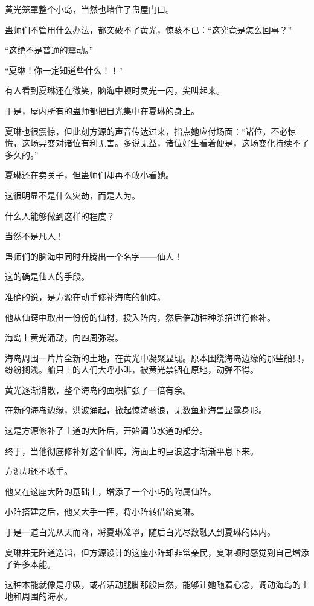 \begin{this_body}
黄光笼罩整个小岛，当然也堵住了蛊屋门口。

蛊师们不管用什么办法，都突破不了黄光，惊骇不已：“这究竟是怎么回事？”

“这绝不是普通的震动。”

“夏琳！你一定知道些什么！！”

有人看到夏琳还在微笑，脑海中顿时灵光一闪，尖叫起来。

于是，屋内所有的蛊师都把目光集中在夏琳的身上。

夏琳也很震惊，但此刻方源的声音传达过来，指点她应付场面：“诸位，不必惊慌，这场异变对诸位有利无害。多说无益，诸位好生看着便是，这场变化持续不了多久的。”

夏琳还在卖关子，但蛊师们却再不敢小看她。

这很明显不是什么灾劫，而是人为。

什么人能够做到这样的程度？

当然不是凡人！

蛊师们的脑海中同时升腾出一个名字——仙人！

这的确是仙人的手段。

准确的说，是方源在动手修补海底的仙阵。

他从仙窍中取出一份份的仙材，投入阵内，然后催动种种杀招进行修补。

海岛上黄光涌动，向四周弥漫。

海岛周围一片片全新的土地，在黄光中凝聚显现。原本围绕海岛边缘的那些船只，纷纷搁浅。船只上的人们大呼小叫，被黄光禁锢在原地，动弹不得。

黄光逐渐消散，整个海岛的面积扩张了一倍有余。

在新的海岛边缘，洪波涌起，掀起惊涛骇浪，无数鱼虾海兽显露身形。

这是方源修补了土道的大阵后，开始调节水道的部分。

终于，当他彻底修补好这个仙阵，海面上的巨浪这才渐渐平息下来。

方源却还不收手。

他又在这座大阵的基础上，增添了一个小巧的附属仙阵。

小阵搭建之后，他又大手一挥，将小阵转借给夏琳。

于是一道白光从天而降，将夏琳笼罩，随后白光尽数融入到夏琳的体内。

夏琳并无阵道造诣，但方源设计的这座小阵却非常亲民，夏琳顿时感觉到自己增添了许多本能。

这种本能就像是呼吸，或者活动腿脚那般自然，能够让她随着心念，调动海岛的土地和周围的海水。


\end{this_body}

